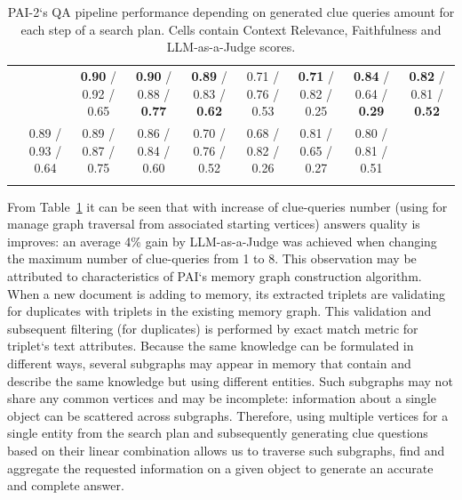 \begin{table}[th!]
{\begin{tabular}{|cc|c|c|c|c|c|c||c|}
    \hhline{|-|~|-|-|-|-|-|-||-|}
    \multicolumn{1}{|c|}{8} &  & \multicolumn{1}{c|}{\textbf{0.90} / 0.92 / 0.65} & \multicolumn{1}{c|}{\cellcolor{grannysmithapple} \textbf{0.90} / 0.88 / \textbf{0.77}} & \multicolumn{1}{c|}{\cellcolor{grannysmithapple} \textbf{0.89} / 0.83 / \textbf{0.62}} & \multicolumn{1}{c|}{0.71 / 0.76 / 0.53} & \multicolumn{1}{c|}{\textbf{0.71} / 0.82 / 0.25} & \cellcolor{grannysmithapple} \textbf{0.84} / 0.64 / \textbf{0.29} & \cellcolor{grannysmithapple} \textbf{0.82} / 0.81 / \textbf{0.52} \\ 
    \hhline{========::=}
    \multicolumn{2}{|c|}{Mean} & \multicolumn{1}{c|}{0.89 / 0.93 / 0.64} & \multicolumn{1}{c|}{0.89 / 0.87 / 0.75} & \multicolumn{1}{c|}{0.86 / 0.84 / 0.60} & \multicolumn{1}{c|}{0.70 / 0.76 / 0.52} & \multicolumn{1}{c|}{0.68 / 0.82 / 0.26} & 0.81 / 0.65 / 0.27 & 0.80 / 0.81 / 0.51 \\ 
    \hhline{|--|-|-|-|-|-|-||-|}
    \end{tabular}}
    \renewcommand{\arraystretch}{1}
    \caption{PAI-2`s QA pipeline performance depending on generated clue queries amount for each step of a search plan. Cells contain Context Relevance, Faithfulness and LLM-as-a-Judge scores.}
	\label{tab:main_maxcluequeries_ablation}
\end{table}

From Table~\ref{tab:main_maxcluequeries_ablation} it can be seen that with increase of clue-queries number (using for manage graph traversal from associated starting vertices) answers quality is improves: an average 4\% gain by LLM-as-a-Judge was achieved when changing the maximum number of clue-queries from 1 to 8. This observation may be attributed to characteristics of PAI`s memory graph construction algorithm. When a new document is adding to memory, its extracted triplets are validating for duplicates with triplets in the existing memory graph. This validation and subsequent filtering (for duplicates) is performed by exact match metric for triplet`s text attributes. Because the same knowledge can be formulated in different ways, several subgraphs may appear in memory that contain and describe the same knowledge but using different entities. Such subgraphs may not share any common vertices and may be incomplete: information about a single object can be scattered across subgraphs. Therefore, using multiple vertices for a single entity from the search plan and subsequently generating clue questions based on their linear combination allows us to traverse such subgraphs, find and aggregate the requested information on a given object to generate an accurate and complete answer.

